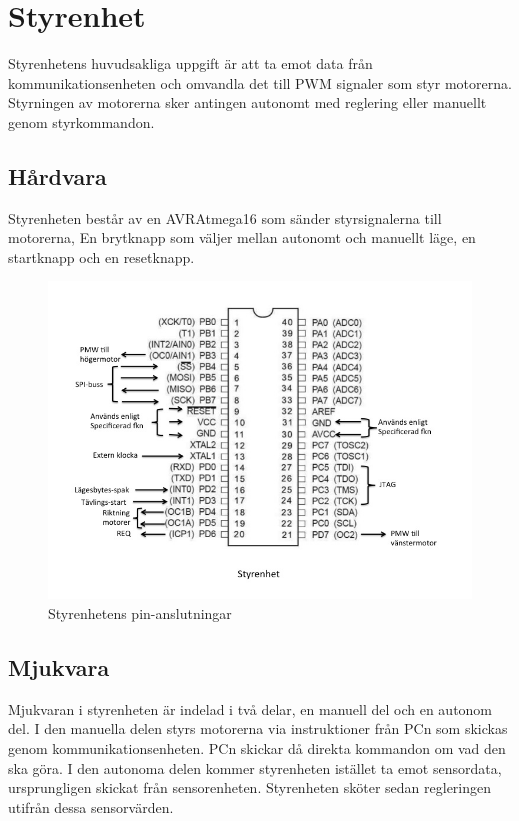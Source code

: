 \section{Styrenhet}

Styrenhetens huvudsakliga uppgift är att ta emot data från
kommunikationsenheten och omvandla det till PWM signaler som styr motorerna.
Styrningen av motorerna sker antingen autonomt med reglering eller 
manuellt genom styrkommandon.

\subsection{Hårdvara}

Styrenheten består av en AVRAtmega16 som sänder styrsignalerna till motorerna, 
En brytknapp som väljer mellan autonomt och manuellt läge, en startknapp och en 
resetknapp.  

\begin{figure}[H]
  \centering
 \includegraphics[angle=0,scale=0.5]{bilder/PIN_styr.jpg}
  \caption{Styrenhetens pin-anslutningar}
  \label{fig:PINstyr}
\end{figure}


\subsection{Mjukvara}

Mjukvaran i styrenheten är indelad i två delar, en manuell del och en autonom del.
I den manuella delen styrs motorerna via instruktioner från PCn som skickas 
genom kommunikationsenheten. PCn skickar då direkta kommandon om vad 
den ska göra. I den autonoma delen kommer styrenheten istället ta emot 
sensordata, ursprungligen skickat från sensorenheten. Styrenheten sköter sedan 
regleringen utifrån dessa sensorvärden.

